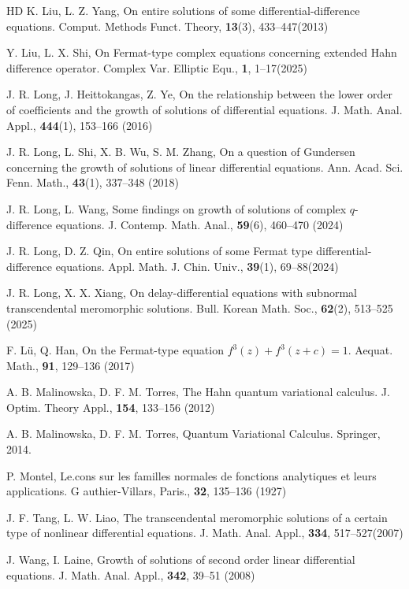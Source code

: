 \documentclass[sn-mathphys-num]{sn-jnl}%
\theoremstyle{thmstyleone}%
\theoremstyle{thmstyletwo}%
\theoremstyle{thmstylethree}%
\begin{document}
\begin{thebibliography}{HD}
 K. Liu, L. Z. Yang, On entire solutions of some differential-difference equations. Comput. Methods Funct. Theory, \textbf{13}(3), 433--447(2013)

 Y. Liu, L. X. Shi, On Fermat-type complex equations concerning extended Hahn difference operator. Complex Var. Elliptic Equ., \textbf{1}, 1--17(2025)

 J. R. Long, J. Heittokangas, Z. Ye, On the relationship between the lower order of coefficients and the growth of solutions of differential equations. J. Math. Anal. Appl., \textbf{444}(1), 153--166 (2016)

 J. R. Long, L. Shi, X. B. Wu, S. M. Zhang, On a question of Gundersen concerning the growth of solutions of linear differential equations. Ann. Acad. Sci. Fenn. Math., \textbf{43}(1), 337--348 (2018)

 J. R. Long, L. Wang, Some findings on growth of solutions of complex $q$-difference equations. J. Contemp. Math. Anal., \textbf{59}(6), 460--470 (2024)

 J. R. Long, D. Z. Qin, On entire solutions of some Fermat type differential-difference equations. Appl. Math. J. Chin. Univ., \textbf{39}(1), 69--88(2024)

 J. R. Long, X. X. Xiang, On delay-differential equations with subnormal transcendental meromorphic solutions. Bull. Korean Math. Soc., \textbf{62}(2), 513--525 (2025)

 F. L\"{u}, Q. Han, On the Fermat-type equation $f^3(z) + f^3(z+ c) = 1$. Aequat. Math., \textbf{91}, 129--136 (2017)

 A. B. Malinowska, D. F. M. Torres, The Hahn quantum variational calculus. J. Optim. Theory Appl., \textbf{154}, 133--156 (2012)

 A. B. Malinowska, D. F. M. Torres, Quantum Variational Calculus. Springer, 2014.

 P. Montel, Le.cons sur les familles normales de fonctions analytiques et leurs applications. G authier-Villars, Paris., \textbf{32}, 135--136 (1927)

 J. F. Tang, L. W. Liao, The transcendental meromorphic solutions of a certain type of nonlinear differential equations. J. Math. Anal. Appl., \textbf{334}, 517--527(2007)

 J. Wang, I. Laine, Growth of solutions of second order linear differential equations. J. Math. Anal. Appl., \textbf{342}, 39--51 (2008)


\end{thebibliography}
\end{document}
